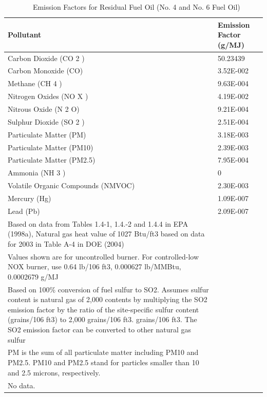 \begin{longtable}[c]{p{4.5in}p{1.5in}}
\caption{  Emission Factors for Residual Fuel Oil (No. 4 and No. 6 Fuel Oil) \protect \label{table:emission-factors-for-residual-fuel-oil-no.-4}}\\
\toprule 
Pollutant & Emission Factor    (g/MJ) \tabularnewline \midrule
\endhead
Carbon Dioxide (CO 2 ) & 50.23439 \tabularnewline
Carbon Monoxide (CO) & 3.52E-002 \tabularnewline
Methane (CH 4 ) & 9.63E-004 \tabularnewline
Nitrogen Oxides (NO X ) & 4.19E-002 \tabularnewline
Nitrous Oxide (N 2 O) & 9.21E-004 \tabularnewline
Sulphur Dioxide (SO 2 ) & 2.51E-004 \tabularnewline
Particulate Matter (PM) & 3.18E-003 \tabularnewline
Particulate Matter (PM10) & 2.39E-003 \tabularnewline
Particulate Matter (PM2.5) & 7.95E-004 \tabularnewline
Ammonia (NH 3 ) & 0 \tabularnewline
Volatile Organic Compounds (NMVOC) & 2.30E-003 \tabularnewline
Mercury (Hg) & 1.09E-007 \tabularnewline
Lead (Pb) & 2.09E-007 \tabularnewline
Based on data from Tables 1.4-1, 1.4.-2 and 1.4.4 in EPA (1998a), Natural gas heat value of 1027 Btu/ft3 based on data for 2003 in Table A-4 in DOE (2004) \tabularnewline
Values shown are for uncontrolled burner. For controlled-low NOX burner, use 0.64 lb/106 ft3, 0.000627 lb/MMBtu, 0.0002679 g/MJ \tabularnewline
Based on 100\% conversion of fuel sulfur to SO2. Assumes sulfur content is natural gas of 2,000 contents by multiplying the SO2 emission factor by the ratio of the site-specific sulfur content (grains/106 ft3) to 2,000 grains/106 ft3. grains/106 ft3. The SO2 emission factor can be converted to other natural gas sulfur \tabularnewline
PM is the sum of all particulate matter including PM10 and PM2.5. PM10 and PM2.5 stand for particles smaller than 10 and 2.5 microns, respectively. \tabularnewline
No data. \tabularnewline
\bottomrule
\end{longtable}

